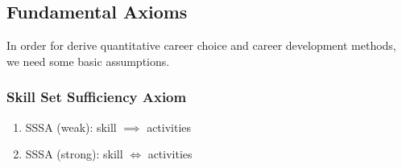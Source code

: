\documentclass{elsarticle} %
\begin{document}
\subsection{Fundamental Axioms}
In order for derive quantitative career choice and career development methods, we need some basic assumptions.

\subsubsection{Skill Set Sufficiency Axiom}
\begin{enumerate}
    \item SSSA (weak): skill $\implies$ activities
    \item SSSA (strong): skill $\iff$ activities
\end{enumerate}
\end{document}
